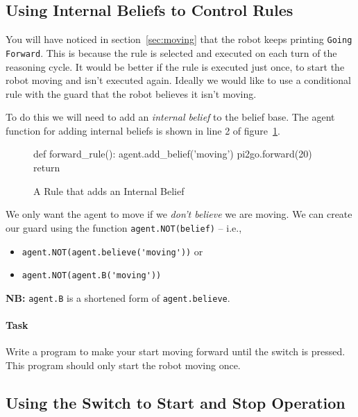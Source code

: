\documentclass[a4,12pt]{article}
\begin{document}
\subsection{Using Internal Beliefs to Control Rules}

You will have noticed in section~\ref{sec:moving} that the robot keeps printing \lstinline{Going Forward}.  This is because the rule is selected and executed on each turn of the reasoning cycle.  It would be better if the rule is executed just once, to start the robot moving and isn't executed again.  Ideally we would like to use a conditional rule with the guard that the robot believes it isn't moving.

To do this we will need to add an \emph{internal belief} to the belief base.  The agent function for adding internal beliefs is shown in line 2 of figure~\ref{code:forward_rule}.
\begin{figure}[htbp]
\begin{pythonlisting}
def forward_rule():
       agent.add_belief('moving')
       pi2go.forward(20)
       return
\end{pythonlisting}
\caption{A Rule that adds an Internal Belief}
\label{code:forward_rule}
\end{figure}

We only want the agent to move if we \emph{don't believe} we are moving.  We can create our guard using the function \lstinline{agent.NOT(belief)} -- i.e.,
\begin{itemize}
\item \lstinline{agent.NOT(agent.believe('moving'))} or
\item \lstinline{agent.NOT(agent.B('moving'))}
\end{itemize}

{\bf NB:}  \lstinline{agent.B} is a shortened form of \lstinline{agent.believe}.

\paragraph{Task}  Write a program to make your start moving forward until the switch is pressed.  This program should only start the robot moving once.


\subsection{Using the Switch to Start and Stop Operation}
\end{document}
